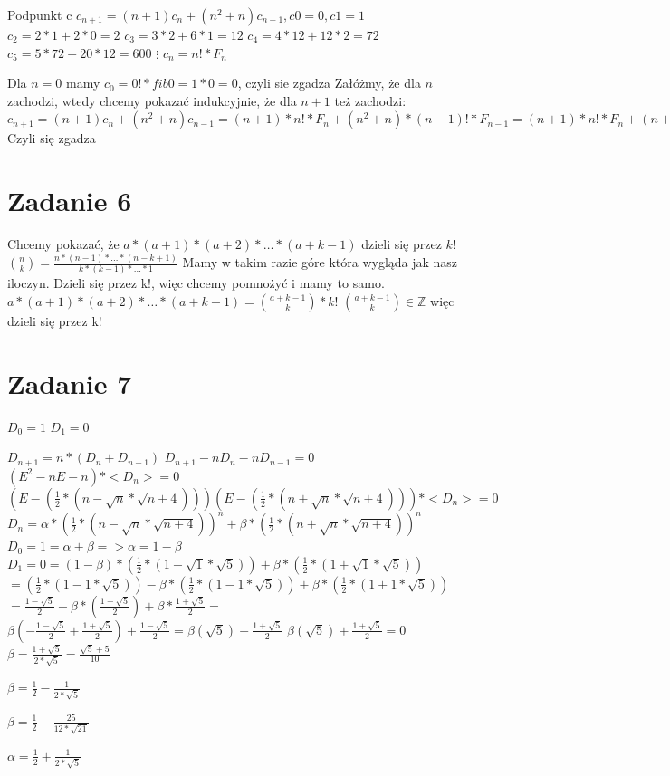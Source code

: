 \documentclass[12pt]{article}
\begin{document}
Podpunkt c 
$c_{n+1} = (n+1)c_n + (n^2+n)c_{n-1}, c0 = 0, c1 = 1$
$c_2 = 2*1 + 2*0 = 2$
$c_3 = 3*2 + 6*1 = 12$
$c_4 = 4*12 + 12*2 = 72$
$c_5 = 5*72 + 20*12 = 600$
$\vdots$
$c_n = n! * F_n$

Dla $n=0$ mamy 
$c_0 = 0! * fib{0} = 1*0 = 0$, czyli sie zgadza
Załóżmy, że dla $n$ zachodzi, wtedy chcemy pokazać indukcyjnie, że dla $n+1$ też zachodzi:
$c_{n+1} = (n+1)c_n + (n^2+n)c_{n-1} = (n+1) * n! * F_n + (n^2+n) * (n-1)! * F_{n-1} = (n+1) * n! * F_n + (n+1) * n * (n-1)! * F_{n-1} = (n+1)! * F_n + (n+1)! * F_{n-1} = (n+1)!(F_n + F_n-1) = (n+1)! * F_{n+1}$ 
Czyli się zgadza

\section{Zadanie 6}
Chcemy pokazać, że $a * (a+1) * (a+2) * \dots * (a+k-1)$ dzieli się przez $k!$
$\binom{n}{k} = \frac{n*(n-1)*\dots*(n-k+1)}{k*(k-1)*\dots*1}$
Mamy w takim razie góre która wygląda jak nasz iloczyn. Dzieli się przez k!, więc chcemy pomnożyć i mamy to samo.
$a * (a+1) * (a+2) * \dots * (a+k-1) = \binom{a+k-1}{k} * k!$
$\binom{a+k-1}{k} \in \mathbb{Z}$ 
więc dzieli się przez k!

\section{Zadanie 7}
$D_0 = 1$
$D_1 = 0$

$D_{n+1} = n*(D_n + D_{n-1})$
$D_{n+1} - nD_n - nD_{n-1} = 0$
$(E^2 - nE - n)*<D_n> = 0$
$(E - (\frac{1}{2}*(n-\sqrt{n}*\sqrt{n+4})))(E-(\frac{1}{2}*(n+\sqrt{n}*\sqrt{n+4})))*<D_n> = 0$
$D_n = \alpha * (\frac{1}{2}*(n-\sqrt{n}*\sqrt{n+4}))^n + \beta * (\frac{1}{2}*(n+\sqrt{n}*\sqrt{n+4}))^n$
$D_0 = 1 = \alpha + \beta => \alpha = 1 - \beta$
$D_1 = 0 = (1 - \beta)*(\frac{1}{2}*(1-\sqrt{1}*\sqrt{5})) + \beta * (\frac{1}{2}*(1+\sqrt{1}*\sqrt{5}))$
$ = (\frac{1}{2}*(1-1*\sqrt{5})) - \beta*(\frac{1}{2}*(1-1*\sqrt{5})) + \beta * (\frac{1}{2}*(1+1*\sqrt{5}))$ 
$= \frac{1-\sqrt{5}}{2} - \beta*(\frac{1-\sqrt{5}}{2}) + \beta*\frac{1+\sqrt{5}}{2} =$
$\beta(- \frac{1-\sqrt{5}}{2} + \frac{1+\sqrt{5}}{2}) + \frac{1-\sqrt{5}}{2} = \beta(\sqrt{5}) + \frac{1+\sqrt{5}}{2}$
$\beta(\sqrt{5}) + \frac{1+\sqrt{5}}{2} = 0$
$\beta = \frac{1+\sqrt{5}}{2*\sqrt{5}} = \frac{\sqrt{5} + 5}{10}$

$\beta = \frac{1}{2} - \frac{1}{2*\sqrt{5}}$

$\beta = \frac{1}{2} - \frac{25}{12*\sqrt{21}}$

$\alpha = \frac{1}{2} + \frac{1}{2*\sqrt{5}}$
\end{document}
